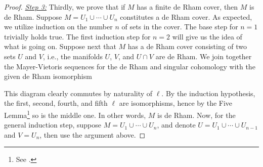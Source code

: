 \documentclass[a4paper, 12pt]{article}
\begin{document}
\begin{proof}
    \underline{\emph{Step 3:}}
    Thirdly, we prove that if $M$ has a finite de Rham cover, then $M$ is de Rham.
    Suppose $M = U_1 \cup \cdots \cup U_n$ constitutes a de Rham cover.
    As expected, we utilize induction on the number $n$ of sets in the cover.
    The base step for $n = 1$ trivially holds true.
    The first induction step for $n = 2$ will give us the idea of what is going on.
    Suppose next that $M$ has a de Rham cover consisting of two sets $U$ and $V$,
    i.e., the manifolds $U$, $V$, and $U \cap V$ are de Rham.
    We join together the Mayer-Vietoris sequences for the de Rham and singular cohomology with the given de Rham isomorphism

    
    This diagram clearly commutes by naturality of $\ell$.
    By the induction hypothesis, the first, second, fourth, and fifth $\ell$ are isomorphisms,
    hence by the Five Lemma\footnote{See \cite[p. 129]{Hatcher2002}.} so is the middle one.
    In other words, $M$ is de Rham.
    Now, for the general induction step,
    suppose $M = U_1 \cup \cdots \cup U_n$,
    and denote $U = U_1 \cup \cdots \cup U_{n-1}$ and $V = U_n$, then use the argument above.


\end{proof}
\end{document}
